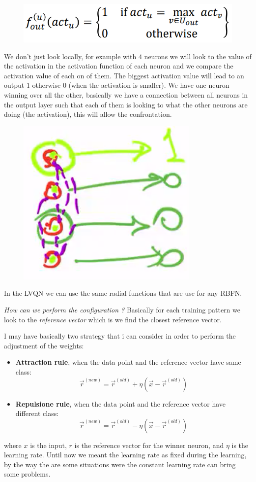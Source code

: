 \documentclass{article}
\begin{document}
\begin{figure}[H]
    \centering
    \includegraphics[scale=0.4]{images/act_lvqnn.png}
\end{figure}
We don't just look locally, for example with $4$ neurons we will look to the value of the activation
in the activation function of each neuron and we compare the activation value of each on of them. The
biggest activation value will lead to an output $1$ otherwise $0$ (when the activation is smaller). We
have one neuron winning over all the other, basically we have a connection between all neurons in the
output layer such that each of them is looking to what the other neurons are doing (the activation),
this will allow the confrontation.
\begin{figure}[H]
    \centering
    \includegraphics[scale=0.6]{images/lvqq_neur_confront.png}
\end{figure}

In the LVQN we can use the same radial functions that are use for any RBFN.

\textit{How can we perform the configuration ?}
Basically for each training pattern we look to the \textit{reference vector} which is
we find the closest reference vector.


I may have basically two strategy that i can consider in order to perform the adjustment of the
weights:
\begin{itemize}
    \item \textbf{Attraction rule}, when the data point and the reference vector have same
          class:
          $$\vec{r}^{(new)}=\vec{r}^{(old)}+\eta(\vec{x}-\vec{r}^{(old)})$$
    \item \textbf{Repulsione rule}, when the data point and the reference vector have different
          class:
          $$\vec{r}^{(new)}=\vec{r}^{(old)}-\eta(\vec{x}-\vec{r}^{(old)})$$
\end{itemize}
where $x$ is the input, $r$ is the reference vector for the winner neuron, and $\eta$ is the learning
rate. Until now we meant the learning rate as fixed during the learning, by the way the are some
situations were the constant learning rate can bring some problems.
\end{document}
